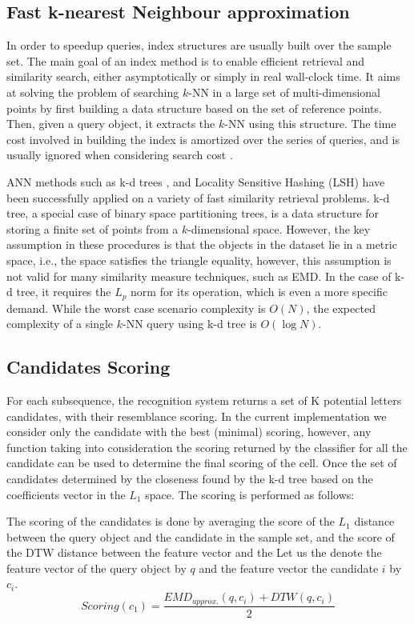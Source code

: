 \documentclass[10pt, conference, compsocconf]{IEEEtran}
\theoremstyle{definition}
\begin{document}
\subsection{Fast k-nearest Neighbour approximation}
In order to speedup queries, index structures are usually built over the sample set. 
The main goal of an index method is to enable efficient retrieval and similarity search, either asymptotically or simply in real wall-clock time. 
It aims at solving the problem of searching $k$-NN in a large set of multi-dimensional points by first building a data structure based on the set of reference points. Then, given a query object, it extracts the $k$-NN using this structure.
The time cost involved in building the index is amortized over the series of queries, and is usually ignored when considering search cost \cite{hetland2009basic}.

ANN methods such as k-d trees \cite{bentley1975multidimensional}, and Locality Sensitive Hashing (LSH) \cite{gionis1999similarity} have been successfully applied on a variety of fast similarity retrieval problems. 
k-d tree, a special case of binary space partitioning trees, is a data structure for storing a finite set of points from a $k$-dimensional space. 
However, the key assumption in these procedures is that the objects in the dataset lie in a metric space, i.e., the space satisfies the triangle equality, however, this assumption is not valid for many similarity measure techniques, such as EMD.
In the case of k-d tree, it requires the $L_p$ norm for its operation, which is even a more specific demand.
While the worst case scenario complexity is $O(N)$, the expected complexity of a single $k$-NN query using k-d tree is $O(\log N)$.

\subsection{Candidates Scoring}
For each subsequence, the recognition system returns a set of K potential letters candidates, with their resemblance scoring. 
In the current implementation we consider only the candidate with the best (minimal) scoring, however, any function taking into consideration the scoring returned by the classifier for all the candidate can be used to determine the final scoring of the cell.
Once the set of candidates determined by the closeness found by the k-d tree based on the coefficients vector in the $L_1$ space. The scoring is performed as follows:

The scoring of the candidates is done by averaging the score of the $L_1$ distance between the query object and the candidate in the sample set, and the score of the DTW distance between the feature vector and the 
Let us the denote the feature vector of the query object by $q$ and the feature vector the candidate $i$ by $c_i$.
\begin{equation}
Scoring(c_1)=\frac{EMD_{approx.}(q,c_i)+DTW(q,c_i)}{2} 
\end{equation}
\end{document}

